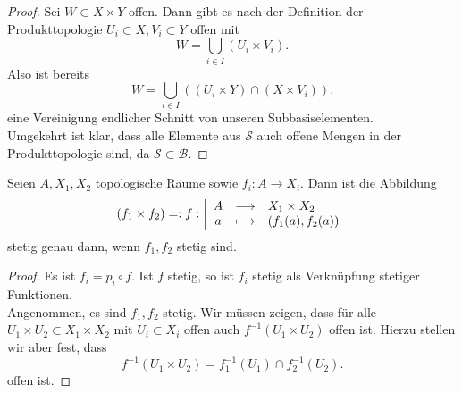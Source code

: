 \begin{proof}
    Sei $W\subset X\times Y$ offen. Dann gibt es nach der Definition der Produkttopologie $U_i\subset X, V_i\subset Y$ offen mit
    \[
        W = \bigcup_{i \in  I} (U_i \times V_i)
    .\] 
    Also ist bereits
    \[
        W = \bigcup_{i \in  I} ((U_i\times Y) \cap (X\times V_i))
    .\] 
    eine Vereinigung endlicher Schnitt von unseren Subbasiselementen. \\
    Umgekehrt ist klar, dass alle Elemente aus $\mathcal{S}$ auch offene Mengen in der Produkttopologie sind, da $\mathcal{S} \subset \mathcal{B}$.
\end{proof}
\begin{theorem}
    Seien $A,X_1,X_2$ topologische Räume sowie $f_i: A \to  X_i$. Dann ist die Abbildung
        \begin{equation*}
            (f_1\times f_2) =: f: \left| \begin{array}{c c l} 
        A & \longrightarrow & X_1\times X_2 \\
        a & \longmapsto &  (f_1(a),f_2(a))
        \end{array} \right.
    \end{equation*}
    stetig genau dann, wenn $f_1,f_2$ stetig sind. \\
\end{theorem}
\begin{proof}
    Es ist $f_i = p_i \circ  f$. Ist $f$ stetig, so ist  $f_i$ stetig als Verknüpfung stetiger Funktionen. \\
    Angenommen, es sind $f_1,f_2$ stetig. Wir müssen zeigen, dass für alle $U_1\times U_2\subset X_1\times X_2$ mit $U_i\subset X_i$ offen auch $f^{-1}(U_1\times U_2)$ offen ist. Hierzu stellen wir aber fest, dass
    \[
        f^{-1}(U_1\times U_2) = f_1^{-1}(U_1) \cap  f_2^{-1}(U_2)
    .\] 
    offen ist.
\end{proof}
